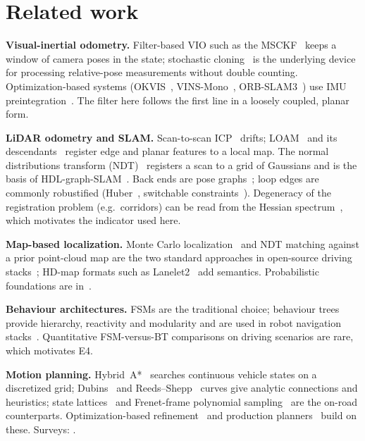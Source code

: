 \documentclass[11pt,a4paper]{article}
\begin{document}
\section{Related work}
\textbf{Visual-inertial odometry.} Filter-based VIO such as the MSCKF~\cite{mourikis07} keeps a window of camera poses in the state; stochastic cloning~\cite{roumeliotis02} is the underlying device for processing relative-pose measurements without double counting. Optimization-based systems (OKVIS~\cite{leutenegger15}, VINS-Mono~\cite{qin18}, ORB-SLAM3~\cite{campos21}) use IMU preintegration~\cite{forster17}. The filter here follows the first line in a loosely coupled, planar form.

\textbf{LiDAR odometry and SLAM.} Scan-to-scan ICP~\cite{besl92,segal09} drifts; LOAM~\cite{zhang14} and its descendants~\cite{shan18,shan20,xu22} register edge and planar features to a local map. The normal distributions transform (NDT)~\cite{biber03,magnusson09} registers a scan to a grid of Gaussians and is the basis of HDL-graph-SLAM~\cite{koide19}. Back ends are pose graphs~\cite{grisetti10,kummerle11}; loop edges are commonly robustified (Huber~\cite{huber64}, switchable constraints~\cite{sunderhauf12}). Degeneracy of the registration problem (e.g.\ corridors) can be read from the Hessian spectrum~\cite{zhang16}, which motivates the indicator used here.

\textbf{Map-based localization.} Monte Carlo localization~\cite{dellaert99} and NDT matching against a prior point-cloud map are the two standard approaches in open-source driving stacks~\cite{kato18}; HD-map formats such as Lanelet2~\cite{poggenhans18} add semantics. Probabilistic foundations are in~\cite{thrun05}.

\textbf{Behaviour architectures.} FSMs are the traditional choice; behaviour trees~\cite{colledanchise18,iovino22} provide hierarchy, reactivity and modularity and are used in robot navigation stacks~\cite{macenski20}. Quantitative FSM-versus-BT comparisons on driving scenarios are rare, which motivates E4.

\textbf{Motion planning.} Hybrid~A*~\cite{dolgov10} searches continuous vehicle states on a discretized grid; Dubins~\cite{dubins57} and Reeds--Shepp~\cite{reeds90} curves give analytic connections and heuristics; state lattices~\cite{pivtoraiko09} and Frenet-frame polynomial sampling~\cite{werling10} are the on-road counterparts. Optimization-based refinement~\cite{zhang21} and production planners~\cite{fan18} build on these. Surveys: \cite{paden16}.
\end{document}
